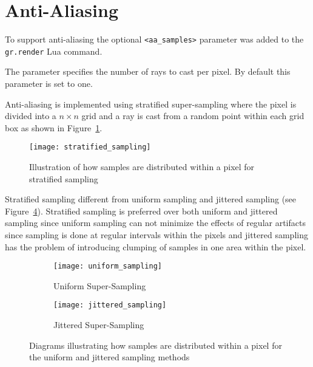 \section{Anti-Aliasing}

To support anti-aliasing the optional \verb|<aa_samples>| parameter was added to
the \verb|gr.render| Lua command.

The parameter specifies the number of rays to cast per pixel. By default this
parameter is set to one.

Anti-aliasing is implemented using stratified super-sampling where the pixel is
divided into a $n\times n$ grid and a ray is cast from a random point within 
each grid box as shown in Figure~\ref{fig:image1}.

\begin{figure}[ht]
\texttt{[image: stratified\_sampling]}
\caption{Illustration of how samples are distributed within a pixel for
stratified sampling}
\label{fig:image1}
\end{figure}

Stratified sampling different from uniform sampling and jittered 
sampling (see Figure~\ref{fig:image2}). Stratified sampling is preferred over both uniform and
jittered sampling since uniform sampling can not minimize the effects of regular 
artifacts since sampling is done at regular intervals within the pixels and
jittered sampling has the problem of introducing clumping of samples in one area
within the pixel.

\begin{figure}[ht]
\begin{subfigure}{0.5\textwidth}
  \texttt{[image: uniform\_sampling]}
  \caption{Uniform Super-Sampling}
  \label{fig:subim1}
\end{subfigure}
\begin{subfigure}{0.5\textwidth}
  \texttt{[image: jittered\_sampling]}
  \caption{Jittered Super-Sampling}
  \label{fig:subim2}
\end{subfigure}
\caption{Diagrams illustrating how samples are distributed within a pixel for
the uniform and jittered sampling methods}
\label{fig:image2}
\end{figure}

